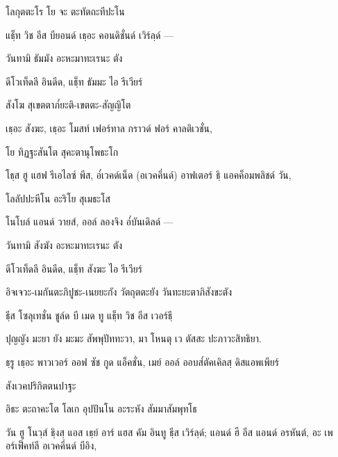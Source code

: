 โลกุตตะโร โย จะ ตะทัตถะทีปะโน

\begin{english}
แธฺ็ท วิช อีส บียอนด์ เธฺอะ คอนดิชั่นด์ เวิร์ลฺด์ —
\end{english}

วันทามิ ธัมมัง อะหะมาทะเรนะ ตัง

\begin{english}
ดีโวเท็ดลี อินดีด, แธฺ็ท ธัมมะ ไอ รีเวียร์
\end{english}

สังโฆ สุเขตตาภ๎ยะติ-เขตตะ-สัญญิโต

\begin{english}
เธฺอะ สังฆะ, เธฺอะ โมสท์ เฟอร์ทาล กราวด์ ฟอร์ คาลติเวชั่น,
\end{english}

โย ทิฏฐะสันโต สุคะตานุโพธะโก

\begin{english}
โธฺส ฮู แฮฟ รีเอไลซ์ พีส, อ๎เวคด์เน็ด (อเวคคึ่นด์) อาฟเตอร์ ธฺิ แอคค็อมพลิชด์ วัน,
\end{english}

โลลัปปะหีโน อะริโย สุเมธะโส

\begin{english}
โนโบล์ แอนด์ วายส์, ออล์ ลองจิง อ๎บันเดิลด์ —
\end{english}

วันทามิ สังฆัง อะหะมาทะเรนะ ตัง

\begin{english}
ดีโวเท็ดลี อินดีด, แธฺ็ท สังฆะ ไอ รีเวียร์
\end{english}

อิจเจวะ-เมกันตะภิปูชะ-เนยยะกัง วัตถุตตะยัง วันทะยะตาภิสังขะตัง

\begin{english}
ธฺีส โซลุเทชั่น ชูล์ด บี เมด ทู แธฺ็ท วิช อีส เวอร์ธฺี
\end{english}

ปุญญัง มะยา ยัง มะมะ สัพพุปัททะวา, มา โหนตุ เว ตัสสะ ปะภาวะสิทธิยา.

\begin{english}
ธฺรู เธฺอะ พาวเวอร์ ออฟ ซัช กูด แอ็คชั่น, เมย์ ออล์ ออบส๎ตัคเคิลสฺ ดิสแอพเพียร์
\end{english}

\begin{instruction}
สังเวคปริกิตตนปาฐะ
\end{instruction}

อิธะ ตะถาคะโต โลเก อุปปันโน อะระหัง สัมมาสัมพุทโธ

\begin{english}
วัน ฮู โนวฺส์ ธฺิงสฺ แอส เธฺย์ อาร์ แฮส คัม อินทู ธฺีส เวิร์ลฺด์; แอนด์ ฮี อีส แอนด์ อรหันต์, อะ เพอร์เฟ็คท์ลี อเวคคึ่นด์ บีอิง,
\end{english}

